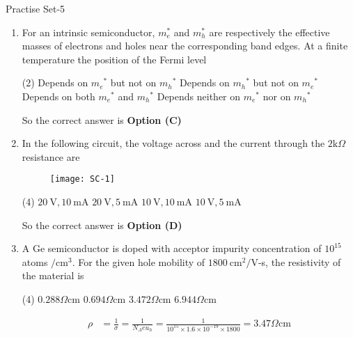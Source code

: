 \newpage
\begin{abox}
	Practise Set-5
\end{abox}
\begin{enumerate}
	\item For an intrinsic semiconductor, $m_{e}^{*}$ and $m_{h}^{*}$ are respectively the effective masses of electrons and holes near the corresponding band edges. At a finite temperature the position of the Fermi level
	{	}
	\begin{tasks}(2)
		\task[\textbf{A.}] Depends on $m_{e}{ }^{*}$ but not on $m_{h}{ }^{*}$
		\task[\textbf{B.}] Depends on $m_{h}{ }^{*}$ but not on $m_{e}{ }^{*}$
		\task[\textbf{C.}] Depends on both $m_{e}{ }^{*}$ and $m_{h}{ }^{*}$
		\task[\textbf{D.}] Depends neither on $m_{e}{ }^{*}$ nor on $m_{h}{ }^{*}$
	\end{tasks}
	\begin{answer}
		So the correct answer is \textbf{Option (C)}
	\end{answer}
	\item In the following circuit, the voltage across and the current through the $2 \mathrm{k} \Omega$ resistance are
	{	}
	\begin{figure}[H]
		\centering
		\texttt{[image: SC-1]}
	\end{figure}
	\begin{tasks}(4)
		\task[\textbf{A.}] $20 \mathrm{~V}, 10 \mathrm{~mA}$
		\task[\textbf{B.}] $20 \mathrm{~V}, 5 \mathrm{~mA}$
		\task[\textbf{C.}] $10 \mathrm{~V}, 10 \mathrm{~mA}$
		\task[\textbf{D.}] $10 \mathrm{~V}, 5 \mathrm{~mA}$
	\end{tasks}
	\begin{answer}
		So the correct answer is \textbf{Option (D)}
	\end{answer}
	\item A Ge semiconductor is doped with acceptor impurity concentration of $10^{15}$ atoms $/ \mathrm{cm}^{3}$. For the given hole mobility of $1800 \mathrm{~cm}^{2} / \mathrm{V}$-s, the resistivity of the material is
	{	}
	\begin{tasks}(4)
		\task[\textbf{A.}] $0.288 \Omega \mathrm{cm}$
		\task[\textbf{B.}] $0.694 \Omega \mathrm{cm}$
		\task[\textbf{C.}] $3.472 \Omega \mathrm{cm}$
		\task[\textbf{D.}] $6.944 \Omega \mathrm{cm}$
	\end{tasks}
	\begin{answer}
		\begin{align*}
		\rho&=\frac{1}{\sigma}=\frac{1}{N_{A} e u_{h}}=\frac{1}{10^{15} \times 1.6 \times 10^{-19} \times 1800}=3.47 \Omega \mathrm{cm}

\end{align*}
\end{answer}
\end{enumerate}
